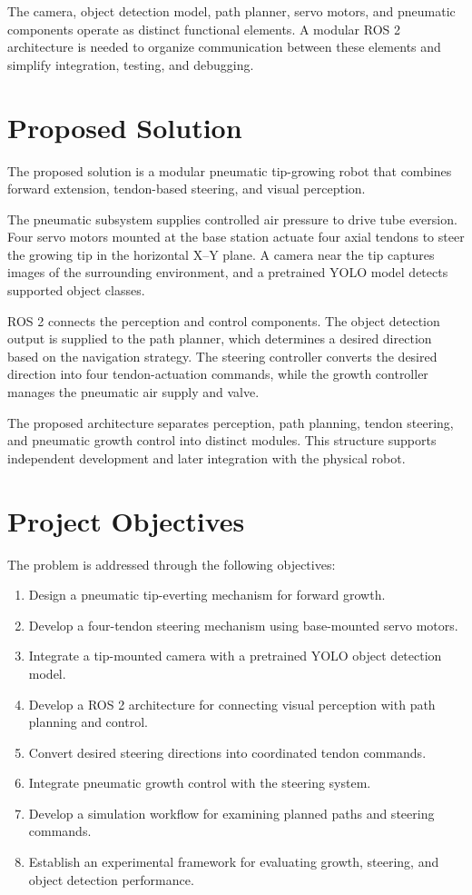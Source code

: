 The camera, object detection model, path planner, servo motors, and pneumatic components operate as distinct functional elements. A modular ROS 2 architecture is needed to organize communication between these elements and simplify integration, testing, and debugging.

\section{Proposed Solution}

The proposed solution is a modular pneumatic tip-growing robot that combines forward extension, tendon-based steering, and visual perception.

The pneumatic subsystem supplies controlled air pressure to drive tube eversion. Four servo motors mounted at the base station actuate four axial tendons to steer the growing tip in the horizontal X--Y plane. A camera near the tip captures images of the surrounding environment, and a pretrained YOLO model detects supported object classes.

ROS 2 connects the perception and control components. The object detection output is supplied to the path planner, which determines a desired direction based on the navigation strategy. The steering controller converts the desired direction into four tendon-actuation commands, while the growth controller manages the pneumatic air supply and valve.

The proposed architecture separates perception, path planning, tendon steering, and pneumatic growth control into distinct modules. This structure supports independent development and later integration with the physical robot.

\section{Project Objectives}

The problem is addressed through the following objectives:

\begin{enumerate}
    \item Design a pneumatic tip-everting mechanism for forward growth.
    \item Develop a four-tendon steering mechanism using base-mounted servo motors.
    \item Integrate a tip-mounted camera with a pretrained YOLO object detection model.
    \item Develop a ROS 2 architecture for connecting visual perception with path planning and control.
    \item Convert desired steering directions into coordinated tendon commands.
    \item Integrate pneumatic growth control with the steering system.
    \item Develop a simulation workflow for examining planned paths and steering commands.
    \item Establish an experimental framework for evaluating growth, steering, and object detection performance.
\end{enumerate}

